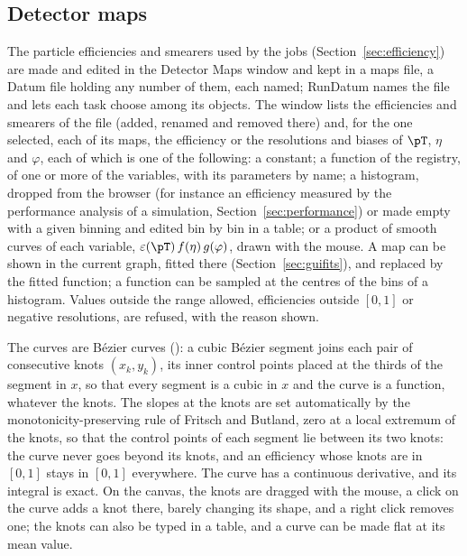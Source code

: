 \subsection{Detector maps}
\label{sec:guimaps}

The particle efficiencies and smearers used by the jobs (Section~\ref{sec:efficiency}) are made and edited in the
Detector Maps window and kept in a maps file, a Datum file holding any number of them, each named; RunDatum names the
file and lets each task choose among its objects. The window lists the efficiencies and smearers of the file (added,
renamed and removed there) and, for the one selected, each of its maps, the efficiency or the resolutions and biases
of $\pT$, $\eta$ and $\varphi$, each of which is one of the following:
a constant; a function of the registry, of one or more of the variables, with its parameters by name; a histogram,
dropped from the browser (for instance an efficiency measured by the performance analysis of a simulation,
Section~\ref{sec:performance}) or made empty with a given binning and edited bin by bin in a table; or a product of
smooth curves of each variable, $\varepsilon(\pT)\, f(\eta)\, g(\varphi)$, drawn with the mouse. A map can be shown in
the current graph, fitted there (Section~\ref{sec:guifits}), and replaced by the fitted function; a function can be sampled
at the centres of the bins of a histogram. Values outside the range allowed, efficiencies outside $[0,1]$ or negative
resolutions, are refused, with the reason shown.

The curves are B\'ezier curves (): a cubic B\'ezier segment joins each pair of consecutive knots
$(x_k,y_k)$, its inner control points placed at the thirds of the segment in $x$, so that every segment is a cubic in
$x$ and the curve is a function, whatever the knots. The slopes at the knots are set automatically by the
monotonicity-preserving rule of Fritsch and Butland, zero at a local extremum of the knots, so that the control
points of each segment lie between its two knots: the curve never goes beyond its knots, and an efficiency whose
knots are in $[0,1]$ stays in $[0,1]$ everywhere. The curve has a continuous derivative, and its integral is exact.
On the canvas, the knots are dragged with the mouse, a click on the curve adds a knot there, barely changing its
shape, and a right click removes one; the knots can also be typed in a table, and a curve can be made flat at its
mean value.

